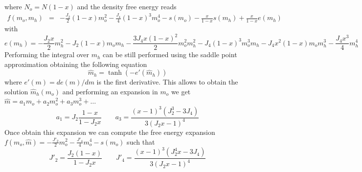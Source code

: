 \documentclass[aps,pre,noshowpacs]{revtex4}
\begin{document}
where $N_o=N(1-x)$ and the density free energy reads
\begin{eqnarray}
f(m_o,m_h)&=&-\frac{J_2}{2} (1-x) m_o^2 - \frac{J_4}{4} (1-x)^3  m_o^4- s(m_o) - \frac{x}{1-x} s(m_h) + \frac{x}{1-x}e(m_h) \end{eqnarray}
with $$e(m_h)=- \frac{J_2 x}{2}  m_h^2- J_2 (1-x)m_o m_h - \frac{ 3 J_4 x (1-x)^2}{2 } m_o^2 m_h^2 -J_4 (1-x)^3 m_o^3 m_h 
- J_4 x^2 (1-x) m_o m_h^3 - \frac{J_4 x^3 }{4} m_h^4
$$
Performing the integral over $m_h$ can be still performed using the saddle point approximation obtaining the following equation
\begin{equation}
\hat{m}_h=\tanh\left(-e'(\hat{m}_h)\right)
\end{equation}
where $e'(m)=de(m)/dm$ is the first derivative. This allows to obtain the solution $\hat{m}_h(m_o)$ and performing an expansion in $m_o$ we get
$\hat{m}=a_1 m_o + a_2 m_o^2 +a_3 m_o^3+\ldots$
\begin{equation}
a_1=J_2 \frac{1-x}{1-J_2 x} \qquad a_3 = \frac{(x-1)^3 \left(J_2^3-3 J_4\right)}{3 (J_2 x-1)^4}
\end{equation}
Once obtain this expansion we can compute the free energy expansion $f(m_o,\hat{m})= -\frac{J'_2}{2} m_o^2 - \frac{J'_4 }{4}m_o^4 -s(m_o)$
such that
$$J'_2 =\frac{J_2 (1-x)}{1-J_2 x} \qquad J'_4= \frac{(x-1)^3 \left(J_2^4 x-3 J_4\right)}{3 (J_2 x-1)^4}$$ 
\end{document}
